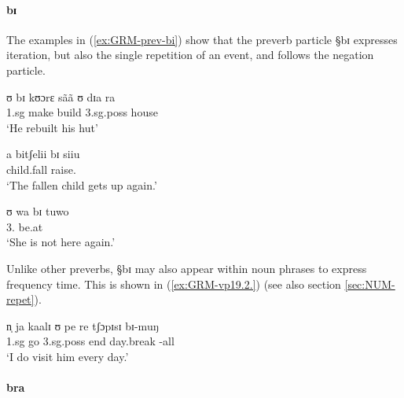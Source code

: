 


\paragraph{bɪ}
\label{sec:GRM-preverb-iteration}

The examples in (\ref{ex:GRM-prev-bi}) show that  the preverb particle {\S bɪ}
expresses iteration, but also the single repetition of an event, and follows the
negation particle. 

\begin{exe} 

\ex\label{ex:GRM-prev-bi}
\begin{xlist}
\ex\label{ex:vp33.2.}
\gll ʊ bɪ kʊɔrɛ sãã ʊ dɪa ra \\
 {\sc 1.sg}     {\itr} make build {\sc 3.sg.poss} house {\foc}    \\
\glt  `He rebuilt his hut' 


\ex\label{ex:GRM-vp10.4}
\gll a bitʃelii bɪ siiu\\
 {\art}  child.fall   {\itr} raise.{\foc}    \\
\glt  `The fallen child gets up again.' 



\ex\label{ex:vp10.4.}
\gll ʊ wa bɪ tuwo \\
       {3.\sg} {\neg} {\itr} be.at\\
\glt  `She is not here again.' 
\end{xlist}
\end{exe} 


Unlike other preverbs,  {\S bɪ} may also appear within noun phrases to express
frequency time. This is shown in (\ref{ex:GRM-vp19.2.}) (see also section
\ref{sec:NUM-repet}).



\begin{exe} 
\ex\label{ex:GRM-vp19.2.}
\gll  n̩ ja  kaalɪ ʊ pe re tʃɔpɪsɪ bɪ-muŋ \\
{\sc 1.sg} {\hab} go {\sc 3.sg.poss} end {\foc}  day.break {\itr}-all\\
\glt  `I do visit him every day.' 

\end{exe} 



 \paragraph{bra}
\label{sec:GRM-preverb-return}

